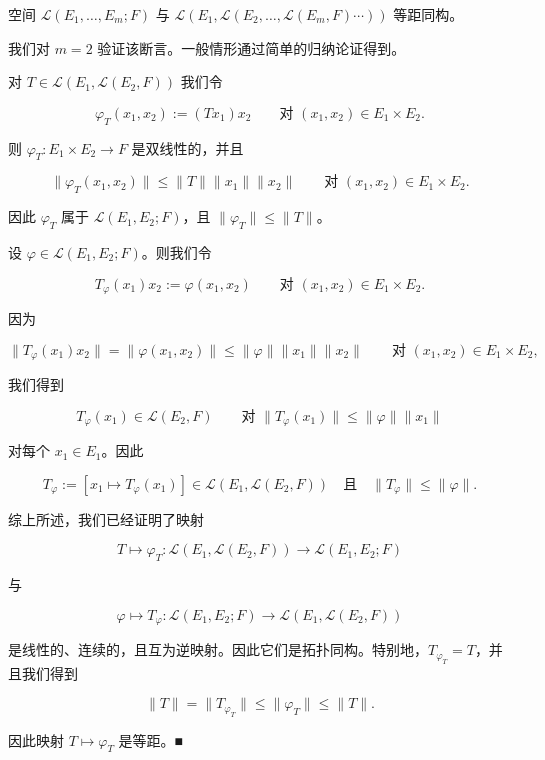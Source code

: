 \begin{theorem}

空间 $ \mathcal{L}(E_1, \ldots, E_m; F) $ 与 $ \mathcal{L}(E_1, \mathcal{L}(E_2, \ldots, \mathcal{L}(E_m, F) \cdots)) $ 等距同构。

\proofhead
我们对 $ m = 2 $ 验证该断言。一般情形通过简单的归纳论证得到。

\begin{subitems}
\item

对 $ T \in \mathcal{L}(E_1, \mathcal{L}(E_2, F)) $ 我们令

\[
\varphi_T(x_1, x_2) := (Tx_1)x_2 \qquad \text{对 } (x_1, x_2) \in E_1 \times E_2 .
\]

则 $ \varphi_T : E_1 \times E_2 \to F $ 是双线性的，并且

\[
\|\varphi_T(x_1, x_2)\| \le \|T\|\|x_1\|\|x_2\| \qquad \text{对 } (x_1, x_2) \in E_1 \times E_2 .
\]

因此 $ \varphi_T $ 属于 $ \mathcal{L}(E_1, E_2; F) $，且 $ \|\varphi_T\| \le \|T\| $。

\item

设 $ \varphi \in \mathcal{L}(E_1, E_2; F) $。则我们令

\[
T_\varphi(x_1)x_2 := \varphi(x_1, x_2) \qquad \text{对 } (x_1, x_2) \in E_1 \times E_2 .
\]

因为

\[
\|T_\varphi(x_1)x_2\| = \|\varphi(x_1, x_2)\| \le \|\varphi\|\|x_1\|\|x_2\| \qquad \text{对 } (x_1, x_2) \in E_1 \times E_2 ,
\]

我们得到

\[
T_\varphi(x_1) \in \mathcal{L}(E_2, F) \qquad \text{对 } \|T_\varphi(x_1)\| \le \|\varphi\|\|x_1\|
\]

对每个 $ x_1 \in E_1 $。因此

\[
T_\varphi := [x_1 \mapsto T_\varphi(x_1)] \in \mathcal{L}(E_1, \mathcal{L}(E_2, F)) \quad \text{且} \quad \|T_\varphi\| \le \|\varphi\| .
\]
\item

综上所述，我们已经证明了映射

\[
T \mapsto \varphi_T : \mathcal{L}(E_1, \mathcal{L}(E_2, F)) \to \mathcal{L}(E_1, E_2; F)
\]

与

\begin{equation}
\varphi \mapsto T_\varphi : \mathcal{L}(E_1, E_2; F) \to \mathcal{L}(E_1, \mathcal{L}(E_2, F))\tag{4.2}
\end{equation}

是线性的、连续的，且互为逆映射。因此它们是拓扑同构。特别地，$ T_{\varphi_T} = T $，并且我们得到

\[
\|T\| = \|T_{\varphi_T}\| \le \|\varphi_T\| \le \|T\| .
\]

因此映射 $ T \mapsto \varphi_T $ 是等距。\nobreak\hspace{0.35em}■

\end{subitems}

\end{theorem}


